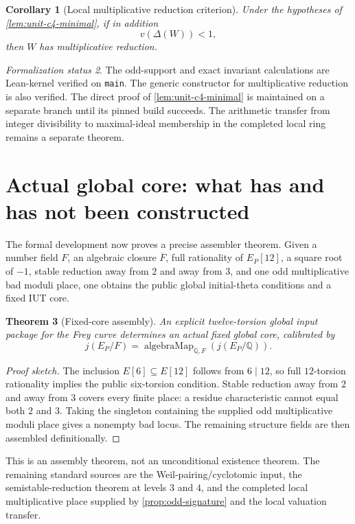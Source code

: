 \documentclass[11pt]{amsart}
\newtheorem{theorem}{Theorem}[section]
\newtheorem{corollary}[theorem]{Corollary}
\theoremstyle{definition}
\theoremstyle{remark}
\newtheorem{status}[theorem]{Formalization status}
\newcommand{\Q}{\mathbb Q}
\begin{document}
\begin{corollary}[Local multiplicative reduction criterion]
Under the hypotheses of \cref{lem:unit-c4-minimal}, if in addition
\[
 v(\Delta(W))<1,
\]
then $W$ has multiplicative reduction.
\end{corollary}

\begin{status}
The odd-support and exact invariant calculations are Lean-kernel verified on
\texttt{main}.  The generic constructor for multiplicative reduction is also
verified.  The direct proof of \cref{lem:unit-c4-minimal} is maintained on a
separate branch until its pinned build succeeds.  The arithmetic transfer from
integer divisibility to maximal-ideal membership in the completed local ring
remains a separate theorem.
\end{status}

\section{Actual global core: what has and has not been constructed}

The formal development now proves a precise assembler theorem.  Given a
number field $F$, an algebraic closure $\overline F$, full rationality of
$E_P[12]$, a square root of $-1$, stable reduction away from $2$ and away from
$3$, and one odd multiplicative bad moduli place, one obtains the public global
initial-theta conditions and a fixed IUT core.

\begin{theorem}[Fixed-core assembly]\label{thm:fixed-core-assembly}
An explicit twelve-torsion global input package for the Frey curve determines
an actual fixed global core, calibrated by
\[
 j(E_P/F)=\operatorname{algebraMap}_{\Q,F}(j(E_P/\Q)).
\]
\end{theorem}

\begin{proof}[Proof sketch]
The inclusion $E[6]\subseteq E[12]$ follows from $6\mid12$, so full
$12$-torsion rationality implies the public six-torsion condition.  Stable
reduction away from $2$ and away from $3$ covers every finite place: a residue
characteristic cannot equal both $2$ and $3$.  Taking the singleton containing
the supplied odd multiplicative moduli place gives a nonempty bad locus.  The
remaining structure fields are then assembled definitionally.
\end{proof}

This is an assembly theorem, not an unconditional existence theorem.  The
remaining standard sources are the Weil-pairing/cyclotomic input, the
semistable-reduction theorem at levels $3$ and $4$, and the completed local
multiplicative place supplied by \cref{prop:odd-signature} and the local
valuation transfer.
\end{document}
